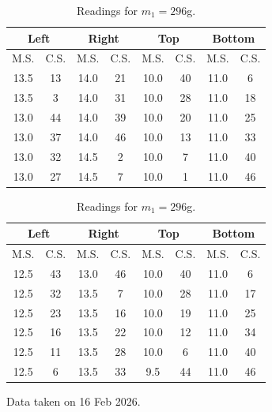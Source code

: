 \documentclass[%
sor,
jor,
 amsmath,amssymb,
 reprint,
longbibliography,
]{revtex4-2}
\begin{document}
\begin{table}[H]
    \centering
    \begin{minipage}[t]{0.49\textwidth}
        \centering
\begin{tabular}{|c|c|c|c|c|c|c|c|}
\hline
\multicolumn{2}{|c|}{Left} & \multicolumn{2}{c|}{Right}  & \multicolumn{2}{c|}{Top} & \multicolumn{2}{c|}{Bottom}  \\
\hline
M.S. & C.S. & M.S. & C.S. & M.S. & C.S. & M.S. & C.S. \\ 
\hline
13.5 & 13 & 14.0 & 21 & 10.0 & 40 & 11.0 & 6 \\
13.5 & 3  & 14.0 & 31 & 10.0 & 28 & 11.0 & 18 \\
13.0 & 44 & 14.0 & 39 & 10.0 & 20 & 11.0 & 25 \\
13.0 & 37 & 14.0 & 46 & 10.0 & 13 & 11.0 & 33 \\
13.0 & 32 & 14.5 & 2  & 10.0 & 7  & 11.0 & 40 \\
13.0 & 27 & 14.5 & 7  & 10.0 & 1  & 11.0 & 46 \\
\hline
\end{tabular}
\caption{Readings for $m_1=197$g.}

    \end{minipage}%
    \hfill %
    \begin{minipage}[t]{0.49\textwidth}
        \centering
\begin{tabular}{|c|c|c|c|c|c|c|c|}
\hline
\multicolumn{2}{|c|}{Left} & \multicolumn{2}{c|}{Right}  & \multicolumn{2}{c|}{Top} & \multicolumn{2}{c|}{Bottom}  \\
\hline
M.S. & C.S. & M.S. & C.S. & M.S. & C.S. & M.S. & C.S. \\ 
\hline
12.5 & 43 & 13.0 & 46 & 10.0 & 40 & 11.0 & 6 \\
12.5 & 32 & 13.5 & 7  & 10.0 & 28 & 11.0 & 17 \\
12.5 & 23 & 13.5 & 16 & 10.0 & 19 & 11.0 & 25 \\
12.5 & 16 & 13.5 & 22 & 10.0 & 12 & 11.0 & 34 \\
12.5 & 11 & 13.5 & 28 & 10.0 & 6 & 11.0 & 40 \\
12.5 & 6  & 13.5 & 33 & 9.5  & 44 & 11.0 & 46 \\
\hline
\end{tabular}
\caption{Readings for $m_1=296$g.}
    \end{minipage}
\end{table}
\begin{center}
	Data taken on 16 Feb 2026.
\end{center}
\end{document}
